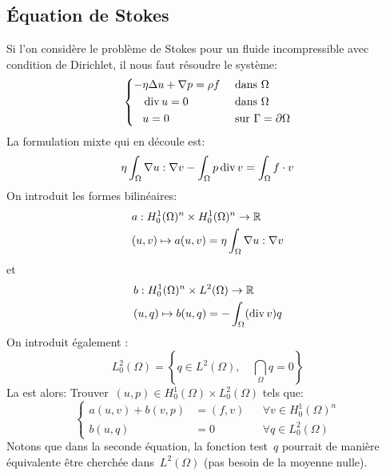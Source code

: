 \subsection{Équation de Stokes}
Si l'on considère le problème de Stokes pour un fluide incompressible avec condition de Dirichlet, il nous faut résoudre le système:
\begin{equation}\left\{
\begin{aligned}
-&\eta \Delta u + \nabla p = \rho f && \text{ dans } \Omega\\
&\operatorname{div} u = 0&& \text{ dans } \Omega\\
&u =0&& \text{ sur } \Gamma=\partial\Omega
\end{aligned}\right.
\end{equation}
La formulation mixte qui en découle est:
\begin{equation}
\eta\dint_\Omega \nabla u: \nabla v %
- \dint_\Omega p \dive v %
= \dint_\Omega f\cdot v %
\end{equation}
On introduit les formes bilinéaires:
\begin{equation}
\begin{aligned}
&a: H^1_0(\Omega)^n\times H^1_0(\Omega)^n \rightarrow \mathbb R \\
&(u,v) \mapsto a(u,v)=\eta\displaystyle\int_\Omega \nabla u: \nabla v
\end{aligned}
\end{equation}
et
\begin{equation}
\begin{aligned}
&b: H^1_0(\Omega)^n\times L^2(\Omega) \rightarrow \mathbb R\\
&(u,q) \mapsto b(u,q)=-\displaystyle\int_\Omega (\operatorname{div} v) q
\end{aligned}
\end{equation}
\medskip
On introduit également :
\begin{equation}L^2_0(\Omega)=\left\{ q\in L^2(\Omega),\quad \dint_\Omega q %
= 0\right\}\end{equation}
\medskip
La  est alors:
Trouver~$(u,p)\in H^1_0(\Omega)\times L^2_0(\Omega)$ tels que:
\begin{equation}\left\{
\begin{aligned}
a(u,v)+b(v,p) &= (f,v) && \forall v\in H^1_0(\Omega)^n \\
b(u,q) &=0 &&\forall q \in L^2_0(\Omega)
\end{aligned}\right.
\end{equation}
Notons que dans la seconde équation, la fonction test~$q$ pourrait de manière équivalente être cherchée dans~$L^2(\Omega)$ (pas besoin de la moyenne nulle).

